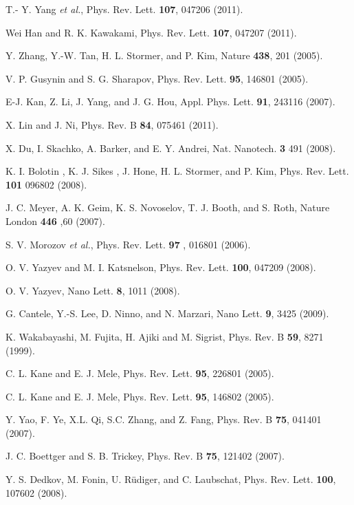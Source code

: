 \documentclass[prb,aps,twocolumn,amsmath,amssymb,floatfix,
superscriptaddress]{revtex4}
\begin{document}
\begin{thebibliography}{99}
 T.- Y. Yang {\it et al.}, Phys. Rev. Lett. {\bf 107},
  047206 (2011).

 Wei Han and R. K. Kawakami, Phys. Rev. Lett. {\bf 107},
  047207 (2011).

 Y. Zhang, Y.-W. Tan, H. L. Stormer, and P. Kim, Nature
  {\bf 438}, 201 (2005).

 V. P. Gusynin and S. G. Sharapov, Phys. Rev. Lett. {\bf
  95}, 146801 (2005).

 E-J. Kan, Z. Li, J. Yang, and J. G. Hou,
  Appl. Phys. Lett. {\bf 91}, 243116 (2007).

 X. Lin and J. Ni, Phys. Rev. B {\bf 84}, 075461 (2011).

 X. Du, I. Skachko, A. Barker, and E. Y. Andrei,
  Nat. Nanotech. {\bf 3} 491 (2008).

 K. I. Bolotin , K. J. Sikes , J. Hone,
  H. L. Stormer, and P. Kim, Phys. Rev. Lett. {\bf 101} 096802 (2008).

 J. C. Meyer, A. K. Geim, K. S. Novoselov, T. J. Booth,
  and S. Roth, Nature London {\bf 446} ,60 (2007).

 S. V. Morozov {\it et al.}, Phys. Rev. Lett. {\bf 97} ,
  016801 (2006).

 O. V. Yazyev and M. I. Katsnelson,
  Phys. Rev. Lett. {\bf 100}, 047209 (2008).

 O. V. Yazyev, Nano Lett. {\bf 8}, 1011 (2008).

 G. Cantele, Y.-S. Lee, D. Ninno, and N. Marzari,
  Nano Lett. {\bf 9}, 3425 (2009).

 K. Wakabayashi, M. Fujita, H. Ajiki and M. Sigrist,
  Phys. Rev. B {\bf 59}, 8271 (1999).

 C. L. Kane and E. J. Mele, Phys. Rev. Lett. {\bf 95},
  226801 (2005).

 C. L. Kane and E. J. Mele, Phys. Rev. Lett. {\bf 95},
  146802 (2005).

 Y. Yao, F. Ye, X.L. Qi, S.C. Zhang, and Z. Fang,
  Phys. Rev. B {\bf 75}, 041401 (2007).

 J. C. Boettger and S. B. Trickey, Phys. Rev. B {\bf
  75}, 121402 (2007).

 Y. S. Dedkov, M. Fonin, U. R\"{u}diger, and
  C. Laubschat, Phys. Rev. Lett. {\bf 100}, 107602 (2008).


\end{thebibliography}
\end{document}
